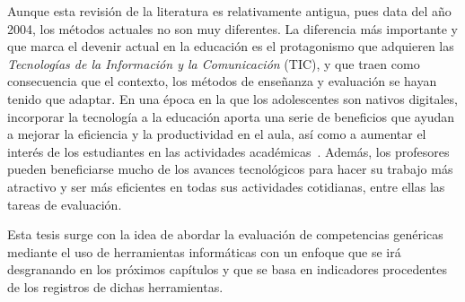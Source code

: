 Aunque esta revisión de la literatura es relativamente antigua, pues data del año 2004, los métodos actuales no son muy diferentes. La diferencia más importante y que marca el devenir actual en la educación es el protagonismo que adquieren las \emph{Tecnologías de la Información y la Comunicación} (TIC), y que traen como consecuencia que el contexto, los métodos de enseñanza y evaluación se hayan tenido que adaptar. En una época en la que los adolescentes son nativos digitales, incorporar la tecnología a la educación aporta una serie de beneficios que ayudan a mejorar la eficiencia y la productividad en el aula, así como a aumentar el interés de los estudiantes en las actividades académicas~\cite{felipegarcia2015beneficios}. Además, los profesores pueden beneficiarse mucho de los avances tecnológicos para hacer su trabajo más atractivo y ser más eficientes en todas sus actividades cotidianas, entre ellas las tareas de evaluación. 

Esta tesis surge con la idea de abordar la evaluación de competencias genéricas mediante el uso de herramientas informáticas con un enfoque que se irá desgranando en los próximos capítulos y que se basa en indicadores procedentes de los registros de dichas herramientas.



